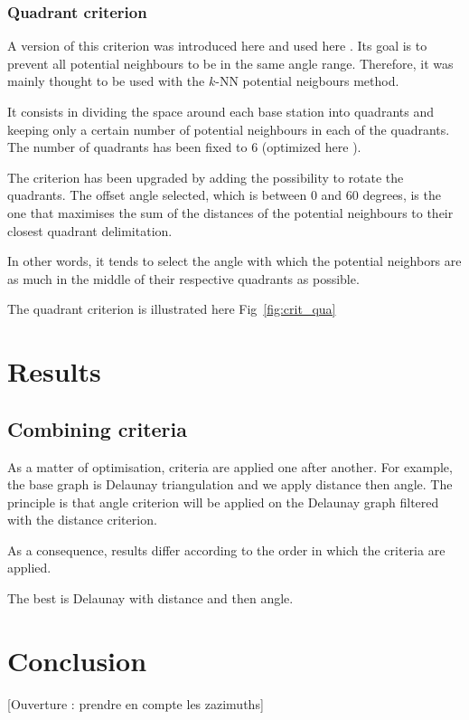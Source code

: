 \documentclass[lettersize,journal,english]{IEEEtran}
\begin{document}
\subsubsection{Quadrant criterion}
A version of this criterion was introduced here \cite{10201211} and used here \cite{art_del_paq}. Its goal is
to prevent all potential neighbours to be in the same angle range. Therefore, it was mainly thought to be used with the 
$k$-NN potential neigbours method.

It consists in dividing the space around each base station into quadrants and keeping only a certain number of potential neighbours
in each of the quadrants. The number of quadrants has been fixed to 6 (optimized here \cite{art_del_paq}).

The criterion has been upgraded by adding the possibility to rotate the quadrants. The offset angle selected, which is between 0 and 
60 degrees, is the one that maximises the sum of the distances of the potential neighbours to their closest quadrant delimitation.

In other words, it tends to select the angle with which the potential neighbors are as much in the middle of their respective quadrants
as possible.

The quadrant criterion is illustrated here Fig~\ref{fig:crit_qua}

\section{Results}

\subsection{Combining criteria}
As a matter of optimisation, criteria are applied one after another. For example, the base graph is Delaunay triangulation and we apply distance then angle.
The principle is that angle criterion will be applied on the Delaunay graph filtered with the distance criterion.

As a consequence, results differ according to the order in which the criteria are applied.

The best is Delaunay with distance and then angle.

\section{Conclusion}

[Ouverture : prendre en compte les zazimuths]

\printglossary[type=\acronymtype]
\printglossary



\end{document}
